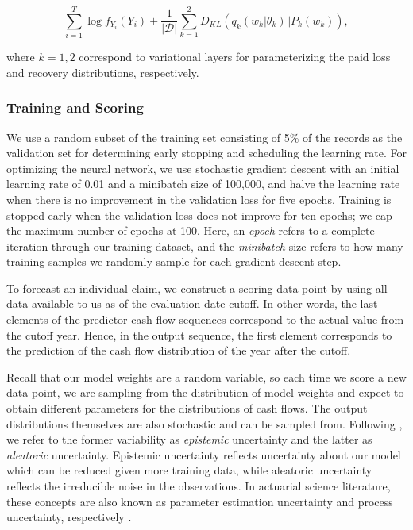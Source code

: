 \documentclass{article}
\begin{document}
\begin{equation}
    \sum_{i = 1}^{T}\log f_{Y_i}(Y_i) + \frac{1}{|\mathcal{D}|}\sum_{k=1}^2D_{KL}(q_k(w_k|\theta_k) \Vert P_k(w_k)),
\end{equation}

where $k=1, 2$ correspond to variational layers for parameterizing the paid loss and recovery distributions, respectively.

\subsubsection{Training and Scoring}

We use a random subset of the training set consisting of 5\% of the records as the validation set for determining early stopping and scheduling the learning rate. For optimizing the neural network, we use stochastic gradient descent with an initial learning rate of 0.01 and a minibatch size of 100,000, and halve the learning rate when there is no improvement in the validation loss for five epochs. Training is stopped early when the validation loss does not improve for ten epochs; we cap the maximum number of epochs at 100. Here, an \textit{epoch} refers to a complete iteration through our training dataset, and the \textit{minibatch} size refers to how many training samples we randomly sample for each gradient descent step.

To forecast an individual claim, we construct a scoring data point by using all data available to us as of the evaluation date cutoff. In other words, the last elements of the predictor cash flow sequences correspond to the actual value from the cutoff year. Hence, in the output sequence, the first element corresponds to the prediction of the cash flow distribution of the year after the cutoff.

Recall that our model weights are a random variable, so each time we score a new data point, we are sampling from the distribution of model weights and expect to obtain different parameters for the distributions of cash flows. The output distributions themselves are also stochastic and can be sampled from. Following \cite{NIPS2017_7141}, we refer to the former variability as \textit{epistemic} uncertainty and the latter as \textit{aleatoric} uncertainty. Epistemic uncertainty reflects uncertainty about our model which can be reduced given more training data, while aleatoric uncertainty reflects the irreducible noise in the observations. In actuarial science literature, these concepts are also known as parameter estimation uncertainty and process uncertainty, respectively \cite{wuthrich2017non}.
\end{document}
